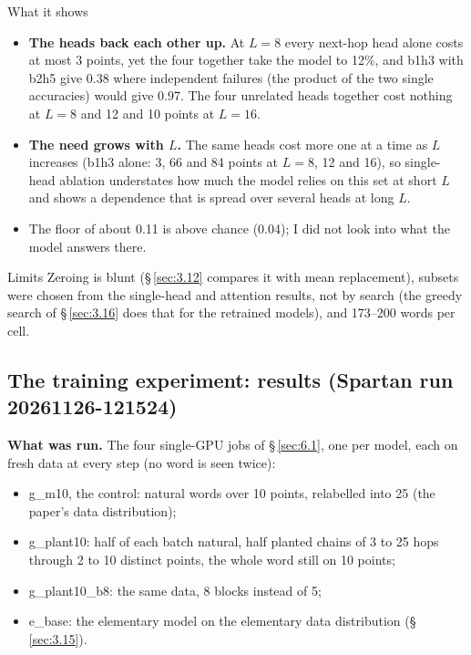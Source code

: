 \documentclass[paper=a4,fontsize=11pt,DIV=11,parskip=half,headings=small,numbers=noendperiod]{scrartcl}
\DeclareRobustCommand{\lead}[1]{\textsf{\bfseries\color{accent}#1}}
\DeclareRobustCommand{\code}[1]{{\fontseries{m}\ttfamily #1}}
\begin{document}
\begin{findbox}{What it shows}
\begin{itemize}
\item \lead{The heads back each other up.} At $L=8$ every next-hop head alone costs at most 3 points, yet the
  four together take the model to 12\%, and b1h3 with b2h5 give 0.38 where independent failures (the product of
  the two single accuracies) would give 0.97. The four unrelated heads together cost nothing at $L=8$ and 12 and
  10 points at $L=16$.
\item \lead{The need grows with $L$.} The same heads cost more one at a time as $L$ increases (b1h3 alone: 3, 66
  and 84 points at $L=8$, 12 and 16), so single-head ablation understates how much the model relies on this set
  at short $L$ and shows a dependence that is spread over several heads at long $L$.
\item The floor of about 0.11 is above chance (0.04); I did not look into what the model answers there.
\end{itemize}
\end{findbox}

\begin{limbox}{Limits}
Zeroing is blunt (\S\,\ref{sec:3.12} compares it with mean replacement), subsets were chosen from the
single-head and attention results, not by search (the greedy search of \S\,\ref{sec:3.16} does that for the
retrained models), and 173–200 words per cell.
\end{limbox}

\subsection{The training experiment: results (Spartan run 20261126-121524)}\label{sec:3.14}
\lead{What was run.} The four single-GPU jobs of \S\,\ref{sec:6.1}, one per model, each on fresh data at every
step (no word is seen twice):

\begin{itemize}
\item \code{g\_\allowbreak{}m10}, the control: natural words over 10 points, relabelled into 25 (the paper’s
  data distribution);
\item \code{g\_\allowbreak{}plant10}: half of each batch natural, half planted chains of 3 to 25 hops through 2
  to 10 distinct points, the whole word still on 10 points;
\item \code{g\_\allowbreak{}plant10\_\allowbreak{}b8}: the same data, 8 blocks instead of 5;
\item \code{e\_\allowbreak{}base}: the elementary model on the elementary data distribution
  (\S\,\ref{sec:3.15}).
\end{itemize}
\end{document}
